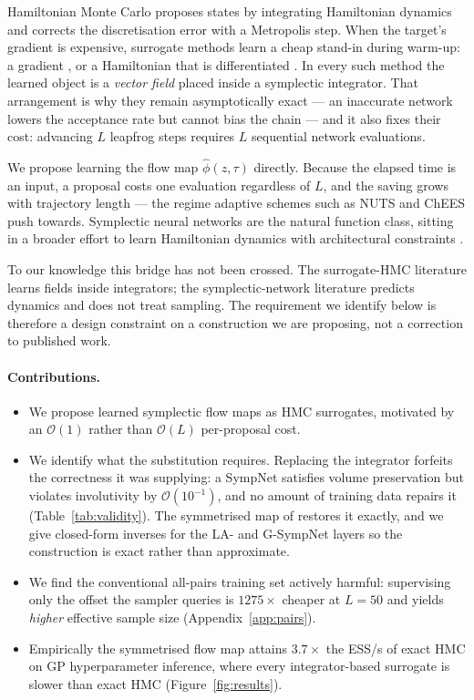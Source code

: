 \documentclass[mlabstract,onecolumn]{jmlr}
\begin{document}
Hamiltonian Monte Carlo \citep{Brooks_2011} proposes states by integrating
Hamiltonian dynamics and corrects the discretisation error with a Metropolis
step. When the target's gradient is expensive, surrogate methods learn a cheap
stand-in during warm-up: a gradient \citep{Li_2019}, or a Hamiltonian that is
differentiated \citep{DHULIPALA2023112425}. In every such method the learned
object is a \emph{vector field} placed inside a symplectic integrator. That
arrangement is why they remain asymptotically exact --- an inaccurate network
lowers the acceptance rate but cannot bias the chain --- and it also fixes their
cost: advancing $L$ leapfrog steps requires $L$ sequential network evaluations.

We propose learning the flow map $\hat\phi(z,\tau)$ directly. Because the
elapsed time is an input, a proposal costs one evaluation regardless of $L$, and
the saving grows with trajectory length --- the regime adaptive schemes such as
NUTS \citep{hoffman2011nouturn} and ChEES \citep{hoffman2021adaptive} push
towards. Symplectic neural networks \citep[SympNets;][]{jin2020sympnets} are the
natural function class, sitting in a broader effort to learn Hamiltonian
dynamics with architectural constraints
\citep{greydanus2019hamiltonian,chen2019neural}.

To our knowledge this bridge has not been crossed. The surrogate-HMC literature
learns fields inside integrators; the symplectic-network literature predicts
dynamics and does not treat sampling. The requirement we identify below is
therefore a design constraint on a construction we are proposing, not a
correction to published work.

\paragraph{Contributions.}
\begin{itemize}
    \item We propose learned symplectic flow maps as HMC surrogates, motivated
    by an $\mathcal{O}(1)$ rather than $\mathcal{O}(L)$ per-proposal cost.
    \item We identify what the substitution requires. Replacing the integrator
    forfeits the correctness it was supplying: a SympNet satisfies volume
    preservation but violates involutivity by $\mathcal{O}(10^{-1})$, and no
    amount of training data repairs it (Table~\ref{tab:validity}). The symmetrised
    map of \citet{valperga2022reversible} restores it exactly, and we give
    closed-form inverses for the LA- and G-SympNet layers so the construction
    is exact rather than approximate.
    \item We find the conventional all-pairs training set actively harmful:
    supervising only the offset the sampler queries is $1275\times$ cheaper at
    $L=50$ and yields \emph{higher} effective sample size (Appendix~\ref{app:pairs}).
    \item Empirically the symmetrised flow map attains $3.7\times$ the ESS/s of
    exact HMC on GP hyperparameter inference, where every integrator-based
    surrogate is slower than exact HMC (Figure~\ref{fig:results}).
\end{itemize}
\end{document}
